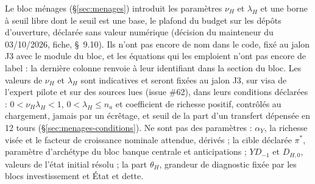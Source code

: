 \documentclass[11pt,a4paper]{article}
\begin{document}
\begin{proposee}
Le bloc ménages (\S\ref{sec:menages}) introduit les paramètres $\nu_H$ et $\lambda_H$ et une borne à seuil libre dont le seuil est une base, le plafond du budget sur les dépôts d'ouverture, déclarée sans valeur numérique (décision du mainteneur du 03/10/2026, fiche, \S~9.10). Ils n'ont pas encore de nom dans le code, fixé au jalon J3 avec le module du bloc, et les équations qui les emploient n'ont pas encore de label : la dernière colonne renvoie à leur identifiant dans la section du bloc. Les valeurs de $\nu_H$ et $\lambda_H$ sont indicatives et seront fixées au jalon J3, sur visa de l'expert pilote et sur des sources lues (issue \#62), dans leurs conditions déclarées : $0 < \nu_H\lambda_H < 1$, $0 < \lambda_H \le n_a$ et coefficient de richesse positif, contrôlés au chargement, jamais par un écrêtage, et seuil de la part d'un transfert dépensée en 12 tours (\S\ref{sec:menages-conditions}). Ne sont pas des paramètres : $\alpha_Y$, la richesse visée et le facteur de croissance nominale attendue, dérivés ; la cible déclarée $\pi^\ast$, paramètre d'archétype du bloc banque centrale et anticipations ; $\mathit{YD}_{-1}$ et $D_{H,0}$, valeurs de l'état initial résolu ; la part $\theta_H$, grandeur de diagnostic fixée par les blocs investissement et État et dette.
\end{proposee}
\end{document}

